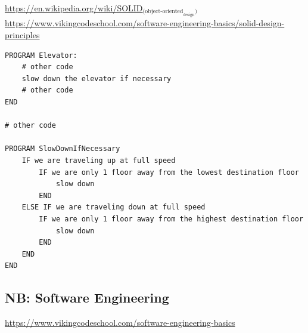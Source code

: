 \documentclass[11pt]{article}
\begin{document}
\url{https://en.wikipedia.org/wiki/SOLID}$_{\text{(object-oriented}_{\text{design}}\text{)}}$
\url{https://www.vikingcodeschool.com/software-engineering-basics/solid-design-principles}

\begin{verbatim}
PROGRAM Elevator:
    # other code
    slow down the elevator if necessary
    # other code
END

# other code

PROGRAM SlowDownIfNecessary
    IF we are traveling up at full speed
        IF we are only 1 floor away from the lowest destination floor
            slow down
        END
    ELSE IF we are traveling down at full speed
        IF we are only 1 floor away from the highest destination floor
            slow down
        END
    END
END
\end{verbatim}

\subsection{NB: Software Engineering}
\label{sec-12-2}

\url{https://www.vikingcodeschool.com/software-engineering-basics}
\end{document}
